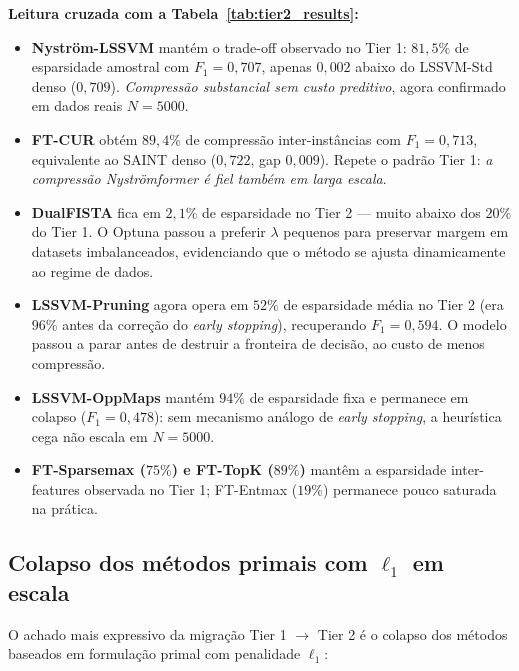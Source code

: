\documentclass[12pt,a4paper]{article}
\begin{document}


\textbf{Leitura cruzada com a Tabela~\ref{tab:tier2_results}:}
\begin{itemize}
  \item \textbf{Nyström-LSSVM} mantém o trade-off observado no Tier 1:
        $81{,}5\%$ de esparsidade amostral com $F_1 = 0{,}707$, apenas
        $0{,}002$ abaixo do LSSVM-Std denso ($0{,}709$). \emph{Compressão
        substancial sem custo preditivo}, agora confirmado em dados reais
        $N=5000$.
  \item \textbf{FT-CUR} obtém $89{,}4\%$ de compressão inter-instâncias com
        $F_1 = 0{,}713$, equivalente ao SAINT denso ($0{,}722$, gap
        $0{,}009$). Repete o padrão Tier 1: \emph{a compressão Nyströmformer
        é fiel também em larga escala}.
  \item \textbf{DualFISTA} fica em $2{,}1\%$ de esparsidade no Tier 2 ---
        muito abaixo dos $20\%$ do Tier 1. O Optuna passou a preferir
        $\lambda$ pequenos para preservar margem em datasets imbalanceados,
        evidenciando que o método se ajusta dinamicamente ao regime de dados.
  \item \textbf{LSSVM-Pruning} agora opera em $52\%$ de esparsidade média
        no Tier 2 (era $96\%$ antes da correção do \emph{early stopping}),
        recuperando $F_1 = 0{,}594$. O modelo passou a parar antes de
        destruir a fronteira de decisão, ao custo de menos compressão.
  \item \textbf{LSSVM-OppMaps} mantém $94\%$ de esparsidade fixa e
        permanece em colapso ($F_1 = 0{,}478$): sem mecanismo análogo de
        \emph{early stopping}, a heurística cega não escala em $N=5000$.
  \item \textbf{FT-Sparsemax ($75\%$) e FT-TopK ($89\%$)} mantêm a
        esparsidade inter-features observada no Tier 1; FT-Entmax ($19\%$)
        permanece pouco saturada na prática.
\end{itemize}

\subsection{Colapso dos métodos primais com $\ell_1$ em escala}
\label{sec:tier2_primal_collapse}

O achado mais expressivo da migração Tier 1 $\to$ Tier 2 é o colapso dos
métodos baseados em formulação primal com penalidade $\ell_1$:
\end{document}

